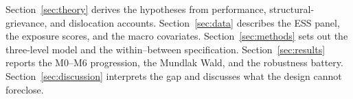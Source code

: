 Section~\ref{sec:theory} derives the hypotheses from performance,
structural-grievance, and dislocation accounts. Section~\ref{sec:data}
describes the ESS panel, the exposure scores, and the macro covariates.
Section~\ref{sec:methods} sets out the three-level model and the
within--between specification. Section~\ref{sec:results} reports the
M0--M6 progression, the Mundlak Wald, and the robustness battery.
Section~\ref{sec:discussion} interprets the gap and discusses what the
design cannot foreclose.
